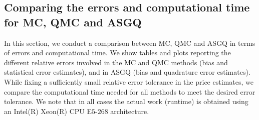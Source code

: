 %	
%
%
\FloatBarrier


\subsection{Comparing the errors and computational time for MC, QMC and ASGQ}\label{sec:Comparing different  errors and complexity for MC and MISC}
In this section, we conduct a comparison between MC, QMC and ASGQ in terms of errors and computational time. We show tables and plots reporting  the different relative errors involved in the MC and QMC  methods (bias and statistical error  estimates), and in ASGQ (bias and quadrature error estimates).  While fixing  a  sufficiently small relative error tolerance in the price estimates,  we  compare the computational time needed for all methods to meet the desired error tolerance.  We note that  in all cases the actual work (runtime) is obtained using an Intel(R) Xeon(R) CPU E$5$-$268$ architecture. 

